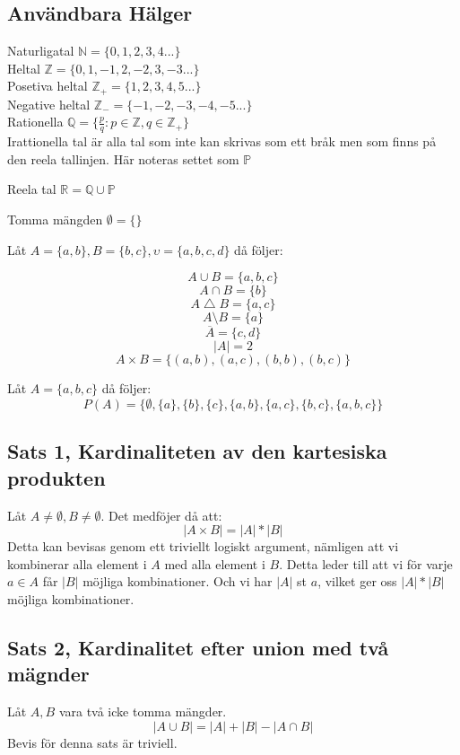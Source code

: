 \documentclass{article}
\begin{document}
	\subsection{Användbara Hälger}
	Naturligatal $\mathbb{N} = \{0, 1, 2, 3, 4...\}$\\
	Heltal $\mathbb{Z} = \{0, 1, -1, 2, -2, 3, -3...\}$\\
	Posetiva heltal $\mathbb{Z}_{+} = \{1, 2, 3, 4, 5...\}$\\
	Negative heltal $\mathbb{Z}_{-} = \{-1, -2, -3, -4, -5...\}$\\
	Rationella $\mathbb{Q} = \{\frac{p}{q} : p \in \mathbb{Z}, q \in \mathbb{Z}_{+}\}$\\

	Irattionella tal är alla tal som inte kan skrivas som ett bråk men som finns på den reela tallinjen. Här noteras settet som $\mathbb{P}$

	Reela tal \( \mathbb{R} = \mathbb{Q} \cup \mathbb{P} \)

	Tomma mängden $\emptyset = \{\}$

	Låt $A = \{a, b\}, B = \{b, c\}, \upsilon = \{a, b, c, d\}$ då följer:

	$$ A \cup B = \{a, b, c\} $$
	$$ A \cap B = \{b\} $$
	$$ A \bigtriangleup B = \{a, c\} $$
	$$ A \setminus B = \{a\} $$
	$$ \overline{A} = \{c, d\} $$
	$$ |A| = 2 $$
	$$ A \times B = \{(a, b), (a, c), (b, b), (b, c)\}$$

	Låt $A = \{a, b, c\}$ då följer: 
	$$ P(A) = \{\emptyset, \{a\}, \{b\}, \{c\}, \{a, b\}, \{a, c\}, \{b, c\}, \{a, b, c\}\} $$

	\subsection{Sats 1, Kardinaliteten av den kartesiska produkten}
	Låt $A \not= \emptyset, B \not= \emptyset$. Det medföjer då att:
	$$ |A \times B| = |A| * |B| $$ 
	Detta kan bevisas genom ett triviellt logiskt argument, nämligen att vi kombinerar alla element i $A$ med alla element i $B$. 
	Detta leder till att vi för varje $a \in A$ får $|B|$ möjliga kombinationer. Och vi har $|A|$ st $a$, vilket ger oss $ |A| * |B| $ möjliga kombinationer. 
	
	\subsection{Sats 2, Kardinalitet efter union med två mägnder}
	Låt $A, B$ vara två icke tomma mängder.
	$$ |A \cup B| = |A| + |B| - |A \cap B| $$
	Bevis för denna sats är triviell.
	
\end{document}
